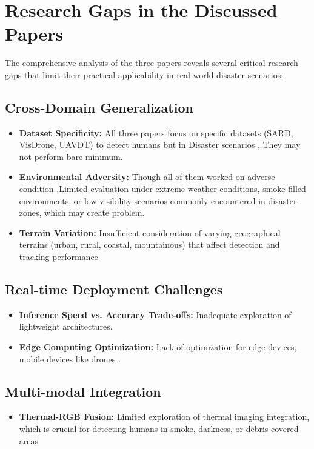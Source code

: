 \documentclass[12pt,a4paper]{report}
\begin{document}
\section{Research Gaps in the Discussed Papers}

The comprehensive analysis of the three papers reveals several critical research gaps that limit their practical applicability in real-world disaster scenarios:

\subsection{Cross-Domain Generalization}
\begin{itemize}
\item \textbf{Dataset Specificity:} All three papers focus on specific datasets (SARD, VisDrone, UAVDT) to detect humans but in Disaster scenarios , They may not perform bare minimum. 
\item \textbf{Environmental Adversity:} Though all of them worked on adverse condition ,Limited evaluation under extreme weather conditions, smoke-filled environments, or low-visibility scenarios commonly encountered in disaster zones, which may create problem.
\item \textbf{Terrain Variation:} Insufficient consideration of varying geographical terrains (urban, rural, coastal, mountainous) that affect detection and tracking performance
\end{itemize}

\subsection{Real-time Deployment Challenges}
\begin{itemize}
\item \textbf{Inference Speed vs. Accuracy Trade-offs:} Inadequate exploration of lightweight architectures.
\item \textbf{Edge Computing Optimization:} Lack of optimization for edge devices, mobile devices like drones .
\end{itemize}

\subsection{Multi-modal Integration}
\begin{itemize}
\item \textbf{Thermal-RGB Fusion:} Limited exploration of thermal imaging integration, which is crucial for detecting humans in smoke, darkness, or debris-covered areas
\end{itemize}
\end{document}
